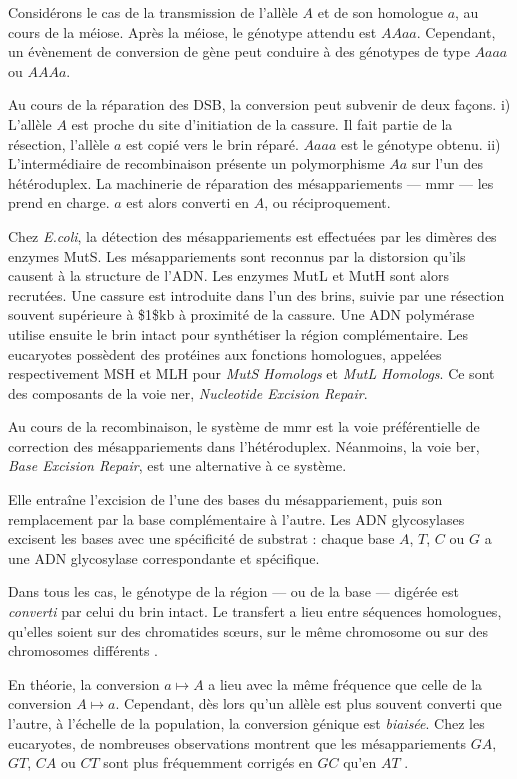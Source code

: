 \documentclass[11pt, oneside]{scrartcl}
\begin{document}
Considérons le cas de la transmission de l'allèle \(A\) et de son homologue \(a\),
au cours de la méiose. Après la méiose, le génotype attendu est \(AAaa\).
Cependant, un évènement de conversion de gène peut conduire à des génotypes de
type \(Aaaa\) ou \(AAAa\). 

Au cours de la réparation des DSB, la conversion peut subvenir de deux façons.
i) L'allèle \(A\) est proche du site d'initiation de la cassure. Il fait partie de
la résection, l'allèle \(a\) est copié vers le brin réparé. \(Aaaa\) est le génotype
obtenu. ii) L'intermédiaire de recombinaison présente un polymorphisme \(Aa\) sur
l'un des hétéroduplex. La machinerie de réparation des mésappariements ---
\ac{mmr} --- les prend en charge. \(a\) est alors converti en \(A\), ou
réciproquement.

Chez \emph{E.coli}, la détection des mésappariements est effectuées par les dimères
des enzymes MutS. Les mésappariements sont reconnus par la distorsion qu'ils
causent à la structure de l'ADN. Les enzymes MutL et MutH sont alors recrutées.
Une cassure est introduite dans l'un des brins, suivie par une résection souvent
supérieure à \$1\$kb à proximité de la cassure. Une ADN polymérase utilise ensuite
le brin intact pour synthétiser la région complémentaire. Les eucaryotes
possèdent des protéines aux fonctions homologues, appelées respectivement MSH et
MLH pour \emph{MutS Homologs} et \emph{MutL Homologs}. Ce sont des composants de la voie
\ac{ner}, \emph{Nucleotide Excision Repair}.

Au cours de la recombinaison, le système de \ac{mmr} est la voie préférentielle
de correction des mésappariements dans l'hétéroduplex. Néanmoins, la voie
\ac{ber}, \emph{Base Excision Repair}, est une alternative à ce système.

Elle entraîne l'excision de l'une des bases du mésappariement, puis son
remplacement par la base complémentaire à l'autre. Les ADN glycosylases excisent
les bases avec une spécificité de substrat : chaque base \(A\), \(T\), \(C\) ou \(G\) a
une ADN glycosylase correspondante et spécifique.

Dans tous les cas, le génotype de la région --- ou de la base --- digérée est
\emph{converti} par celui du brin intact. Le transfert a lieu entre séquences
homologues, qu'elles soient sur des chromatides sœurs, sur le même chromosome ou
sur des chromosomes différents \cite{chen_gene_2007}.

\begin{transition}

En théorie, la conversion $a \mapsto A$ a lieu avec la même fréquence que celle
de la conversion $A \mapsto a$. Cependant, dès lors qu'un allèle est plus
souvent converti que l'autre, à l'échelle de la population, la conversion
génique est {\em biaisée}. Chez les eucaryotes, de nombreuses observations montrent
que les mésappariements $GA$, $GT$, $CA$ ou $CT$ sont plus fréquemment corrigés
en $GC$ qu'en $AT$ \cite{duret_biased_2009}. 

\end{transition}
\end{document}
